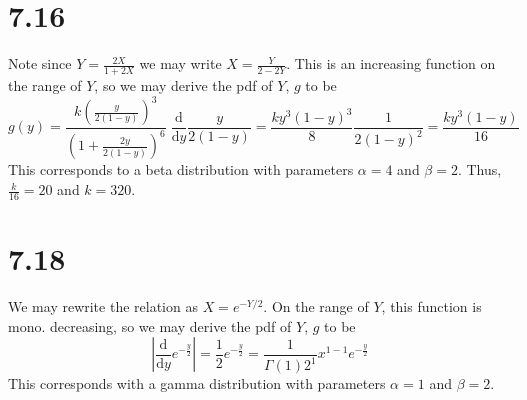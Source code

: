\documentclass{article}
\begin{document}
\section*{7.16}
Note since $Y = \frac{2X}{1+2X}$ we may write $X = \frac{Y}{2-2Y}$. This is an increasing function on the range of $Y$, so we may derive the pdf of $Y$, $g$ to be
$$g(y) = \frac{k\left(\frac{y}{2(1-y)}\right)^3}{\left(1+\frac{2y}{2(1-y)}\right)^6}\;\frac{\mathrm{d}}{\mathrm{d}y}\frac{y}{2(1-y)} = \frac{ky^3(1-y)^3}{8}\frac{1}{2(1-y)^2}=\frac{ky^3(1-y)}{16}$$
This corresponds to a beta distribution with parameters $\alpha = 4$ and $\beta = 2$. Thus, $\frac{k}{16} = 20$ and $k = 320$.

\section*{7.18}
We may rewrite the relation as $X = e^{-{Y}/{2}}$. On the range of $Y$, this function is mono. decreasing, so we may derive the pdf of $Y$, $g$ to be
$$\left\lvert\frac{\mathrm{d}}{\mathrm{d}y}e^{-\frac{y}{2}}\right\rvert = \frac{1}{2}e^{-\frac{y}{2}} = \frac{1}{\Gamma(1)2^1}x^{1-1}e^{-\frac{y}{2}}$$
This corresponds with a gamma distribution with parameters $\alpha = 1$ and $\beta = 2$.
\end{document}
